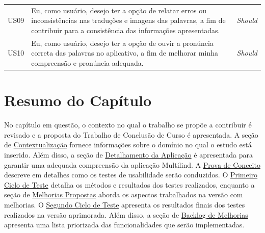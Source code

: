 \begin{table}[h!]
\begin{tabularx}{\textwidth}{p{1cm}|p{12cm}|p{1cm}}
	US09 & Eu, como usuário, desejo ter a opção de relatar erros ou inconsistências nas traduções e imagens das palavras, a fim de contribuir para a consistência das informações apresentadas.                                  & \textit{Should}      \\
	US10 & Eu, como usuário, desejo ter a opção de ouvir a pronúncia correta das palavras no aplicativo, a fim de melhorar minha compreensão e pronúncia adequada.                                                               & \textit{Should}      \\ \hline
	\end{tabularx}
\end{table}

\section{Resumo do Capítulo}
\label{sec:Resumo Proposta}
No capítulo em questão, o contexto no qual o trabalho se propõe a contribuir é revisado e a proposta do Trabalho de Conclusão de Curso é apresentada. A seção de \hyperref[sec:Contextualização]{Contextualização} fornece informações sobre o domínio no qual o estudo está inserido. Além disso, 
a seção de \hyperref[sec:Detalhamento da Aplicacao]{Detalhamento da Aplicação} é apresentada para garantir uma adequada compreensão da aplicação Multilind. A \hyperref[sec:Prova de Conceito]{Prova de Conceito} descreve em detalhes como os testes de usabilidade serão conduzidos. O \hyperref[sec:Primeiro Ciclo]{Primeiro Ciclo de Teste} 
detalha os métodos e resultados dos testes realizados, enquanto a seção de \hyperref[sec:Melhorias Propostas]{Melhorias Propostas} aborda os aspectos trabalhados na versão com melhorias. O \hyperref[sec:Segundo Ciclo]{Segundo Ciclo de Teste} apresenta os resultados finais dos testes realizados na versão aprimorada. 
Além disso, a seção de \hyperref[sec:Backlog]{Backlog de Melhorias} apresenta uma lista priorizada das funcionalidades que serão implementadas. 